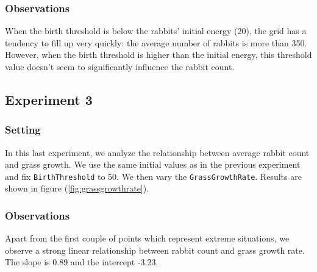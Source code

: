 \documentclass[11pt]{article}
\begin{document}
\subsubsection{Observations}

When the birth threshold is below the rabbits' initial energy (20), the grid has a tendency to fill up very quickly: the average number of rabbits is more than 350. However, when the birth threshold is higher than the initial energy, this threshold value doesn't seem to significantly influence the rabbit count.

\subsection{Experiment 3}
\subsubsection{Setting}
In this last experiment, we analyze the relationship between average rabbit count and grass growth. We use the same initial values as in the previous experiment and fix \texttt{BirthThreshold} to 50. We then vary the \texttt{GrassGrowthRate}. Results are shown in figure (\ref{fig:grassgrowthrate}). 

\subsubsection{Observations}

Apart from the first couple of points which represent extreme situations, we observe a strong linear relationship between rabbit count and grass growth rate. The slope is 0.89 and the intercept -3.23.

\end{document}
